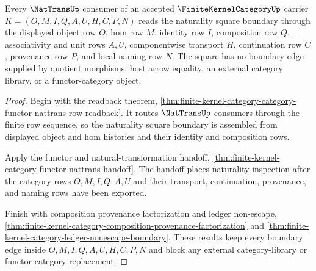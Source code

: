 \begin{theorem}
\label{thm:finite-kernel-category-natural-transformation-square-boundary}
Every $\NatTransUp$ consumer of an accepted $\FiniteKernelCategoryUp$ carrier
$K=(O,M,I,Q,A,U,H,C,P,N)$ reads the naturality square boundary through the
displayed object row $O$, hom row $M$, identity row $I$, composition row $Q$,
associativity and unit rows $A,U$, componentwise transport $H$, continuation
row $C$, provenance row $P$, and local naming row $N$. The square has no
boundary edge supplied by quotient morphisms, host arrow equality, an external
category library, or a functor-category object.
\end{theorem}
\begin{proof}
Begin with the readback theorem,
\autoref{thm:finite-kernel-category-category-functor-nattrans-row-readback}.
It routes $\NatTransUp$ consumers through the finite row sequence, so the
naturality square boundary is assembled from displayed object and hom histories
and their identity and composition rows.

Apply the functor and natural-transformation handoff,
\autoref{thm:finite-kernel-category-functor-nattrans-handoff}. The handoff
places naturality inspection after the category rows $O,M,I,Q,A,U$ and their
transport, continuation, provenance, and naming rows have been exported.

Finish with composition provenance factorization and ledger non-escape,
\autoref{thm:finite-kernel-category-composition-provenance-factorization} and
\autoref{thm:finite-kernel-category-ledger-nonescape-boundary}. These results
keep every boundary edge inside $O,M,I,Q,A,U,H,C,P,N$ and block any external
category-library or functor-category replacement.
\end{proof}

